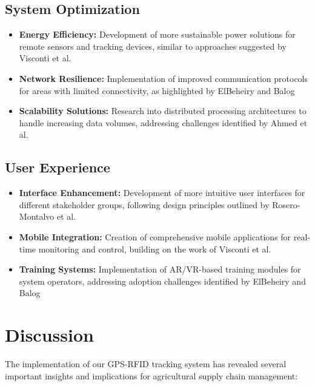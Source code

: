 \documentclass[conference]{IEEEtran}
\begin{document}
\subsection{System Optimization}
\begin{itemize}
    \item \textbf{Energy Efficiency:} Development of more sustainable power solutions for remote sensors and tracking devices, similar to approaches suggested by Visconti et al. \cite{visconti2020development}
    
    \item \textbf{Network Resilience:} Implementation of improved communication protocols for areas with limited connectivity, as highlighted by ElBeheiry and Balog \cite{elbeheiry2023technologies}
    
    \item \textbf{Scalability Solutions:} Research into distributed processing architectures to handle increasing data volumes, addressing challenges identified by Ahmed et al. \cite{ahmed2024optimized}
\end{itemize}

\subsection{User Experience}
\begin{itemize}
    \item \textbf{Interface Enhancement:} Development of more intuitive user interfaces for different stakeholder groups, following design principles outlined by Rosero-Montalvo et al. \cite{rosero2023smart}
    
    \item \textbf{Mobile Integration:} Creation of comprehensive mobile applications for real-time monitoring and control, building on the work of Visconti et al. \cite{visconti2020development}
    
    \item \textbf{Training Systems:} Implementation of AR/VR-based training modules for system operators, addressing adoption challenges identified by ElBeheiry and Balog \cite{elbeheiry2023technologies}
\end{itemize}

\section{Discussion}
The implementation of our GPS-RFID tracking system has revealed several important insights and implications for agricultural supply chain management:
\end{document}
